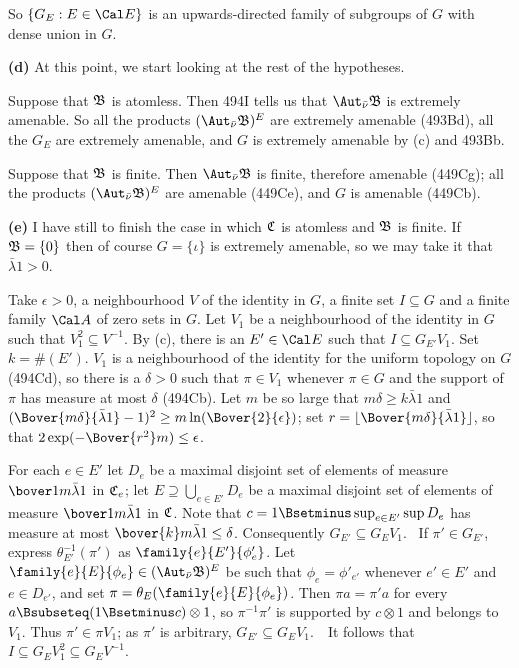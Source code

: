 {So $\{G_E:E\in\Cal E\}$ is an upwards-directed family of subgroups of $G$
with dense union in $G$.

\medskip

{\bf (d)} At this point, we start looking at the rest of the hypotheses.

\medskip

 Suppose that $\frak B$ is atomless.   Then 494I tells us
that $\Aut_{\bar\nu}\frak B$ is extremely amenable.   So all the products
$(\Aut_{\bar\nu}\frak B)^E$ are extremely amenable (493Bd), all the $G_E$
are extremely amenable, and $G$ is extremely amenable by (c) and 493Bb.

\medskip

 Suppose that $\frak B$ is finite.   Then
$\Aut_{\bar\nu}\frak B$ is finite, therefore amenable (449Cg);
all the products $(\Aut_{\bar\nu}\frak B)^E$ are amenable (449Ce),
and $G$ is amenable (449Cb).

\medskip

{\bf (e)} I have still to finish the case in which $\frak C$ is atomless
and $\frak B$ is finite.   If $\frak B=\{0\}$ then of course $G=\{\iota\}$
is extremely amenable, so we may take it that $\bar\lambda 1>0$.

\medskip

 Take
$\epsilon>0$, a neighbourhood $V$ of the identity in $G$, a finite set
$I\subseteq G$ and a finite family $\Cal A$ of zero sets in $G$.
Let $V_1$ be a neighbourhood of the identity in $G$ such that
$V_1^2\subseteq V^{-1}$.   By (c), there is an $E'\in\Cal E$ such that
$I\subseteq G_{E'}V_1$.   Set $k=\#(E')$.
$V_1$ is a neighbourhood of the identity for
the uniform topology on $G$ (494Cd), so there is a $\delta>0$ such that
$\pi\in V_1$ whenever $\pi\in G$ and the support of
$\pi$ has measure at most $\delta$ (494Cb).   Let $m$ be so large that
$m\delta\ge k\bar\lambda 1$ and
$(\Bover{m\delta}{\bar\lambda 1}-1)^2\ge m\ln(\Bover{2}{\epsilon})$;  set
$r=\lfloor\Bover{m\delta}{\bar\lambda 1}\rfloor$, so that
$2\exp(-\Bover{r^2}m)\le\epsilon$.

\medskip

 For each $e\in E'$ let $D_e$ be a maximal disjoint set of
elements of measure $\bover1m\bar\lambda 1$ in $\frak C_e$;
let $E\supseteq\bigcup_{e\in E'}D_e$ be a maximal disjoint
set of elements of measure $\bover1m\bar\lambda 1$ in $\frak C$.   Note that
$c=1\Bsetminus\sup_{e\in E'}\sup D_e$ has
measure at most $\bover{k}m\bar\lambda 1\le\delta$.
Consequently $G_{E'}\subseteq G_EV_1$.   \Prf\
If $\pi'\in G_{E'}$, express $\theta_{E'}^{-1}(\pi')$ as
$\family{e}{E'}{\phi'_e}$.   Let
$\family{e}{E}{\phi_e}\in(\Aut_{\bar\nu}\frak B)^E$
be such that
$\phi_e=\phi'_{e'}$ whenever $e'\in E'$ and $e\in D_{e'}$, and set
$\pi=\theta_E(\family{e}{E}{\phi_e})$.   Then
$\pi a=\pi'a$ for every $a\Bsubseteq(1\Bsetminus c)\otimes 1$,
so $\pi^{-1}\pi'$ is
supported by $c\otimes 1$ and belongs to $V_1$.
Thus $\pi'\in\pi V_1$;  as $\pi'$
is arbitrary, $G_{E'}\subseteq G_EV_1$.\ \QeD\  It follows that
$I\subseteq G_EV_1^2\subseteq G_EV^{-1}$.

}
